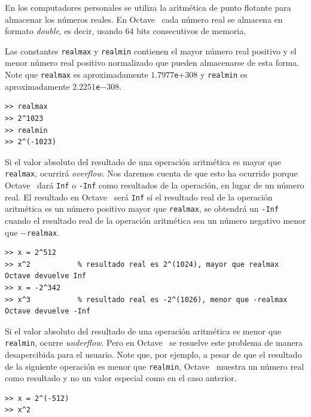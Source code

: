 \documentclass[letter,11pt]{article}
\newcommand\0{\mathbf{0}}
\newcommand{\octave}{{\sc Octave }}
\begin{document}
	En los computadores personales se utiliza la aritm\'etica de punto flotante para
	almacenar los n\'umeros reales. En \octave\, cada n\'umero real se almacena en formato {\em double}, es decir,
	usando 64 bits consecutivos de memoria.
    
Las constantes \texttt{realmax} y \texttt{realmin} contienen el mayor
n\'umero real positivo y el menor n\'umero real positivo normalizado que
pueden almacenarse de esta forma. Note que \texttt{realmax} es aproximadamente
$1.7977$\texttt{e}$+308$ y \texttt{realmin} es aproximadamente $2.2251$\texttt{e}$-308$.

\medskip

\begin{lstlisting}
>> realmax
>> 2^1023
>> realmin
>> 2^(-1023)
\end{lstlisting}

\medskip
	
	Si el valor absoluto del resultado de una operaci\'on aritm\'etica
	es mayor que \Verb+realmax+, ocu\-rri\-r\'a {\em overflow}. Nos daremos cuenta
	de que esto ha ocurrido porque \octave\, dar\'a
	\Verb+Inf+ o \Verb+-Inf+ como resultados de la operaci\'on, en lugar de
	un n\'umero real.
	El resultado en \octave\, ser\'a \Verb+Inf+ si el resultado real de
	la operaci\'on aritm\'etica es un n\'umero positivo mayor que \Verb+realmax+,
	se obtendr\'a un \Verb+-Inf+ cuando el resultado real
	de la operaci\'on aritm\'etica sea un n\'umero negativo menor que $-$\Verb+realmax+.

\newpage

\begin{lstlisting}[gobble=2,frame=single]
>> x = 2^512
>> x^2           % resultado real es 2^(1024), mayor que realmax Octave devuelve Inf
>> x = -2^342
>> x^3           % resultado real es -2^(1026), menor que -realmax  Octave devuelve -Inf
\end{lstlisting}

\medskip

	Si el valor absoluto del resultado de una operaci\'on aritm\'etica es menor
	que \Verb+realmin+, ocurre {\em underflow}. Pero en \octave\, se resuelve
	este problema de manera desapercibida para el usuario. Note que, por ejemplo,
	a pesar de que el resultado de la siguiente operaci\'on es menor que \Verb+realmin+,
	\octave\, muestra un n\'umero real como resultado y no un valor especial como en el caso
	anterior.

\medskip

\begin{lstlisting}[gobble=2,frame=single]
>> x = 2^(-512)
>> x^2
\end{lstlisting}
\end{document}
